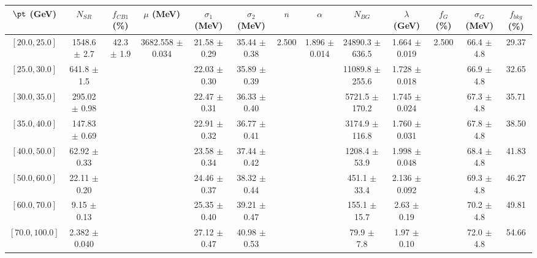 \begin{tabular}{c||c|c|c|c|c|c|c|c|c|c|c||c}
$\pt$ (GeV) & $N_{SR}$ & $f_{CB1}$ (\%) & $\mu$ (MeV) & $\sigma_1$ (MeV) & $\sigma_2$ (MeV) & $n$ & $\alpha$ & $N_{BG}$ & $\lambda$ (GeV) & $f_G$ (\%) & $\sigma_G$ (MeV) & $f_{bkg}$ (\%) \\
\hline
$[20.0, 25.0]$ & 1548.6 $\pm$ 2.7 & \multirow{8}{*}{42.3 $\pm$ 1.9} & \multirow{8}{*}{3682.558 $\pm$ 0.034} & 21.58 $\pm$ 0.29 & 35.44 $\pm$ 0.38 & \multirow{8}{*}{2.500} & \multirow{8}{*}{1.896 $\pm$ 0.014} & 24890.3 $\pm$ 636.5 & 1.664 $\pm$ 0.019 & \multirow{8}{*}{2.500} & 66.4 $\pm$ 4.8 & 29.37\\
$[25.0, 30.0]$ & 641.8 $\pm$ 1.5 &  &  & 22.03 $\pm$ 0.30 & 35.89 $\pm$ 0.39 &  &  & 11089.8 $\pm$ 255.6 & 1.728 $\pm$ 0.018 &  & 66.9 $\pm$ 4.8 & 32.65\\
$[30.0, 35.0]$ & 295.02 $\pm$ 0.98 &  &  & 22.47 $\pm$ 0.31 & 36.33 $\pm$ 0.40 &  &  & 5721.5 $\pm$ 170.2 & 1.745 $\pm$ 0.024 &  & 67.3 $\pm$ 4.8 & 35.71\\
$[35.0, 40.0]$ & 147.83 $\pm$ 0.69 &  &  & 22.91 $\pm$ 0.32 & 36.77 $\pm$ 0.41 &  &  & 3174.9 $\pm$ 116.8 & 1.760 $\pm$ 0.031 &  & 67.8 $\pm$ 4.8 & 38.50\\
$[40.0, 50.0]$ & 62.92 $\pm$ 0.33 &  &  & 23.58 $\pm$ 0.34 & 37.44 $\pm$ 0.42 &  &  & 1208.4 $\pm$ 53.9 & 1.998 $\pm$ 0.048 &  & 68.4 $\pm$ 4.8 & 41.83\\
$[50.0, 60.0]$ & 22.11 $\pm$ 0.20 &  &  & 24.46 $\pm$ 0.37 & 38.32 $\pm$ 0.44 &  &  & 451.1 $\pm$ 33.4 & 2.136 $\pm$ 0.092 &  & 69.3 $\pm$ 4.8 & 46.27\\
$[60.0, 70.0]$ & 9.15 $\pm$ 0.13 &  &  & 25.35 $\pm$ 0.40 & 39.21 $\pm$ 0.47 &  &  & 155.1 $\pm$ 15.7 & 2.63 $\pm$ 0.19 &  & 70.2 $\pm$ 4.8 & 49.81\\
$[70.0, 100.0]$ & 2.382 $\pm$ 0.040 &  &  & 27.12 $\pm$ 0.47 & 40.98 $\pm$ 0.53 &  &  & 79.9 $\pm$ 7.8 & 1.97 $\pm$ 0.10 &  & 72.0 $\pm$ 4.8 & 54.66\\
\end{tabular}
